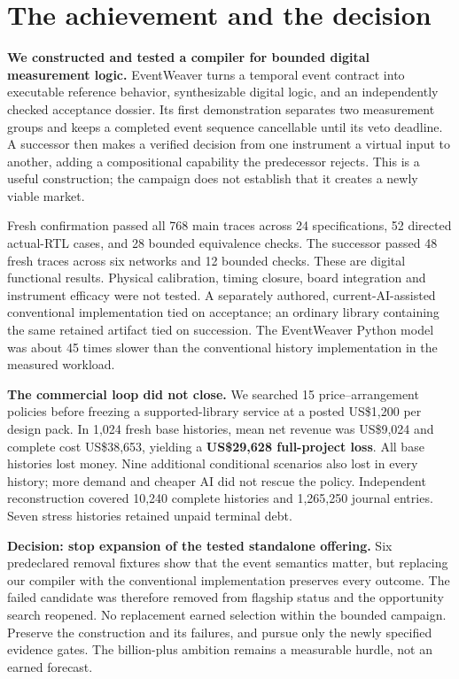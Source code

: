 \documentclass[11pt,letterpaper]{article}
\begin{document}
\section*{The achievement and the decision}
\textbf{We constructed and tested a compiler for bounded digital measurement logic.} EventWeaver turns a temporal event contract into executable reference behavior, synthesizable digital logic, and an independently checked acceptance dossier. Its first demonstration separates two measurement groups and keeps a completed event sequence cancellable until its veto deadline. A successor then makes a verified decision from one instrument a virtual input to another, adding a compositional capability the predecessor rejects. This is a useful construction; the campaign does not establish that it creates a newly viable market.

Fresh confirmation passed all 768 main traces across 24 specifications, 52 directed actual-RTL cases, and 28 bounded equivalence checks. The successor passed 48 fresh traces across six networks and 12 bounded checks. These are digital functional results. Physical calibration, timing closure, board integration and instrument efficacy were not tested. A separately authored, current-AI-assisted conventional implementation tied on acceptance; an ordinary library containing the same retained artifact tied on succession. The EventWeaver Python model was about 45 times slower than the conventional history implementation in the measured workload.

\textbf{The commercial loop did not close.} We searched 15 price--arrangement policies before freezing a supported-library service at a posted US\$1,200 per design pack. In 1,024 fresh base histories, mean net revenue was US\$9,024 and complete cost US\$38,653, yielding a \textbf{US\$29,628 full-project loss}. All base histories lost money. Nine additional conditional scenarios also lost in every history; more demand and cheaper AI did not rescue the policy. Independent reconstruction covered 10,240 complete histories and 1,265,250 journal entries. Seven stress histories retained unpaid terminal debt.

\textbf{Decision: stop expansion of the tested standalone offering.} Six predeclared removal fixtures show that the event semantics matter, but replacing our compiler with the conventional implementation preserves every outcome. The failed candidate was therefore removed from flagship status and the opportunity search reopened. No replacement earned selection within the bounded campaign. Preserve the construction and its failures, and pursue only the newly specified evidence gates. The billion-plus ambition remains a measurable hurdle, not an earned forecast.
\end{document}

